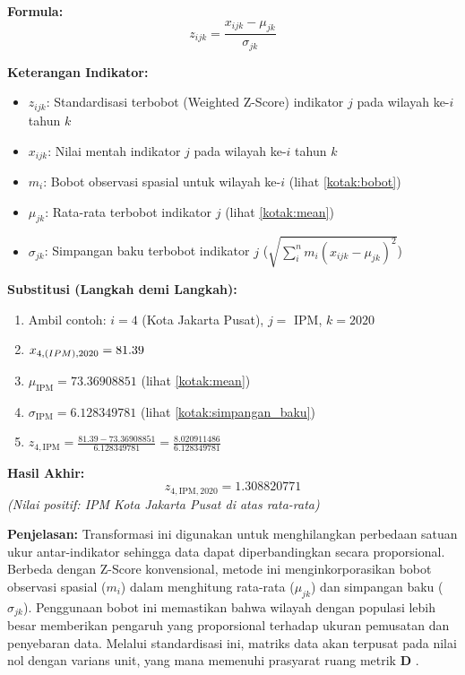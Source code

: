 \documentclass[11pt,a4paper]{article}
\begin{document}
\begin{tcolorbox}[formula_box, title={Standardisasi Data Terbobot (Weighted Z-Score)}] \label{kotak:standardisasi}
\textbf{Formula:}
\[ z_{ijk} = \frac{x_{ijk} - \mu_{jk}}{\sigma_{jk}} \]

\textbf{Keterangan Indikator:}
\begin{itemize}
  \item $z_{ijk}$: Standardisasi terbobot (Weighted Z-Score) indikator $j$ pada wilayah ke-$i$ tahun $k$
  \item $x_{ijk}$: Nilai mentah indikator $j$ pada wilayah ke-$i$ tahun $k$
  \item $m_i$: Bobot observasi spasial untuk wilayah ke-$i$ (lihat \ref{kotak:bobot})
  \item $\mu_{jk}$: Rata-rata terbobot indikator $j$ (lihat \ref{kotak:mean})
  \item $\sigma_{jk}$: Simpangan baku terbobot indikator $j$ ($\sqrt{\sum_{i}^{n} m_i (x_{ijk} - \mu_{jk})^2}$)
\end{itemize}

\textbf{Substitusi (Langkah demi Langkah):}
\begin{enumerate}
  \item Ambil contoh: $i = 4$ (Kota Jakarta Pusat), $j = $ IPM, $k = 2020$
  \item $x_{4,\text(IPM),2020} = 81.39$
  \item $\mu_{\text{IPM}} = 73.36908851$ (lihat \ref{kotak:mean})
  \item $\sigma_{\text{IPM}} = 6.128349781$ (lihat \ref{kotak:simpangan_baku})
  \item $z_{4,\text{IPM}} = \frac{81.39 - 73.36908851}{6.128349781} = \frac{8.020911486}{6.128349781}$
\end{enumerate}

\textbf{Hasil Akhir:}
\[ z_{4,\text{IPM},2020} = 1.308820771 \]
\textit{(Nilai positif: IPM Kota Jakarta Pusat di atas rata-rata)}

\textbf{Penjelasan:} Transformasi ini digunakan untuk menghilangkan perbedaan satuan ukur antar-indikator sehingga data dapat diperbandingkan secara proporsional. Berbeda dengan Z-Score konvensional, metode ini menginkorporasikan bobot observasi spasial ($m_i$) dalam menghitung rata-rata ($\mu_{jk}$) dan simpangan baku ($\sigma_{jk}$). Penggunaan bobot ini memastikan bahwa wilayah dengan populasi lebih besar memberikan pengaruh yang proporsional terhadap ukuran pemusatan dan penyebaran data. Melalui standardisasi ini, matriks data akan terpusat pada nilai nol dengan varians unit, yang mana memenuhi prasyarat ruang metrik $\mathbf{D}$ \citet{lavit94}.
\end{tcolorbox}
\end{document}
